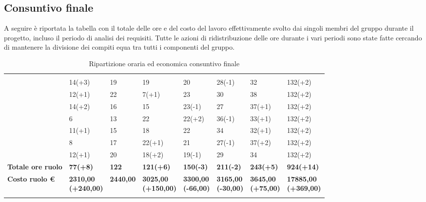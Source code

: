 \subsection{Consuntivo finale}
A seguire è riportata la tabella con il totale delle ore e del costo del lavoro effettivamente svolto dai singoli membri del gruppo durante il progetto, incluso il periodo di analisi dei requisiti. Tutte le azioni di ridistribuzione delle ore durante i vari periodi sono state fatte cercando di mantenere la divisione dei compiti equa tra tutti i componenti del gruppo.
{
\setlength\arrayrulewidth{1pt}
\begin{longtable}{| C{2cm} | C{1.8cm} | C{1.5cm} | C{1.8cm} | C{1.5cm} | C{1.5cm} | C{1.7cm} | C{2cm}|} 
   	 &
   	 &
   	 & 
   	 &
   	 &
   	 & 
   	 &
   	 \\
   	
   	\BM{} & 14(+3) & 19 & 19 & 20 & 28(-1) & 32 & 132(+2)\\
   	\PA{} & 12(+1) & 22 & 7(+1) & 23 & 30 & 38 & 132(+2)\\
   	\RA{} & 14(+2) & 16 & 15 & 23(-1) & 27 & 37(+1) & 132(+2)\\
   	\SH{} & 6 & 13 & 22 & 22(+2) & 36(-1) & 33(+1) & 132(+2)\\
   	\SG{} & 11(+1) & 15 & 18 & 22 & 34 & 32(+1) & 132(+2)\\
   	\SP{} & 8 & 17 & 22(+1) & 21 & 27(-1) & 37(+2) & 132(+2)\\
   	\ZM{} & 12(+1) & 20 & 18(+2) & 19(-1) & 29 & 34 & 132(+2)\\
   
   
   	\color{white}
   	\textbf{Totale ore ruolo} &
   	\color{white}\textbf{77(+8)} & 
   	\color{white}\textbf{122} &
   	\color{white}\textbf{121(+6)} & 
   	\color{white}\textbf{150(-3)} & 
   	\color{white}\textbf{211(-2)} & 
   	\color{white}\textbf{243(+5)} & 
   	\color{white}\textbf{924(+14)}\\   
   	
	\hline   	
   	
   	\color{white}
   	\textbf{Costo ruolo €} &
   	\color{white}\textbf{2310,00\newline(+240,00)} & 
   	\color{white}\textbf{2440,00} &
   	\color{white}\textbf{3025,00\newline(+150,00)} & 
   	\color{white}\textbf{3300,00\newline(-66,00)} & 
   	\color{white}\textbf{3165,00\newline(-30,00)} & 
   	\color{white}\textbf{3645,00\newline(+75,00)} & 
   	\color{white}\textbf{17885,00\newline(+369,00)}\\   
   	 
   \caption{Ripartizione oraria ed economica consuntivo finale}
\end{longtable}
}\
\newpage
